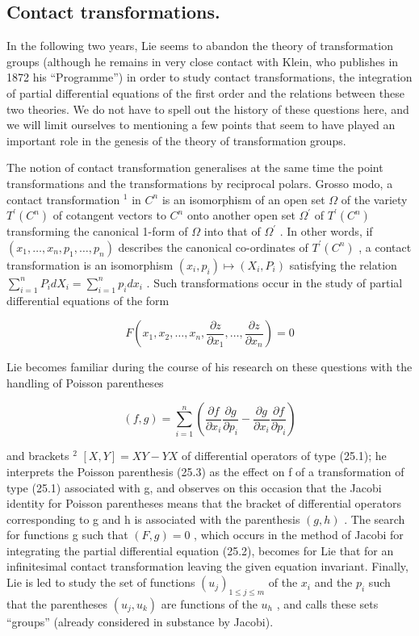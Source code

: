 \subsection{Contact transformations.}

In the following two years, Lie seems to abandon the theory of transformation groups (although he remains in very close contact with Klein, who publishes in 1872 his ``Programme'') in order to study contact transformations, the integration of partial differential equations of the first order and the relations between these two theories. We do not have to spell out the history of these questions here, and we will limit ourselves to mentioning a few points that seem to have played an important role in the genesis of the theory of transformation groups.

The notion of contact transformation generalises at the same time the point transformations and the transformations by reciprocal polars. Grosso modo, a contact transformation \(^{1}\) in \(C^{n}\) is an isomorphism of an open set \(\Omega\) of the variety \(T^{\prime}(C^{n})\) of cotangent vectors to \(C^{n}\) onto another open set \(\Omega^{\prime}\) of \(T^{\prime}(C^{n})\) transforming the canonical 1-form of \(\Omega\) into that of \(\Omega^{\prime}\) . In other words, if \((x_{1},\ldots,x_{n},p_{1},\ldots,p_{n})\) describes the canonical co-ordinates of \(T^{\prime}(C^{n})\) , a contact transformation is an isomorphism \((x_{i},p_{i})\mapsto(X_{i},P_{i})\) satisfying the relation \(\sum_{i=1}^{n}P_{i}dX_{i}=\sum_{i=1}^{n}p_{i}dx_{i}\) . Such transformations occur in the study of partial differential equations of the form

\[
F \left(x _ {1}, x _ {2}, \dots , x _ {n}, \frac {\partial z}{\partial x _ {1}}, \dots , \frac {\partial z}{\partial x _ {n}}\right) = 0\tag{25.2}
\]

Lie becomes familiar during the course of his research on these questions with the handling of Poisson parentheses

\[
(f, g) = \sum_ {i = 1} ^ {n} \left(\frac {\partial f}{\partial x _ {i}} \frac {\partial g}{\partial p _ {i}} - \frac {\partial g}{\partial x _ {i}} \frac {\partial f}{\partial p _ {i}}\right)\tag{25.3}
\]

and brackets \(^{2}\) \([X,Y]=XY-YX\) of differential operators of type (25.1); he interprets the Poisson parenthesis (25.3) as the effect on f of a transformation of type (25.1) associated with g, and observes on this occasion that the Jacobi identity for Poisson parentheses means that the bracket of differential operators corresponding to g and h is associated with the parenthesis \((g,h)\) . The search for functions g such that \((F,g)=0\) , which occurs in the method of Jacobi for integrating the partial differential equation (25.2), becomes for Lie that for an infinitesimal contact transformation leaving the given equation invariant. Finally, Lie is led to study the set of functions \((u_{j})_{1\leq j\leq m}\) of the \(x_{i}\) and the \(p_{i}\) such that the parentheses \((u_{j},u_{k})\) are functions of the \(u_{h}\) , and calls these sets ``groups'' (already considered in substance by Jacobi).


